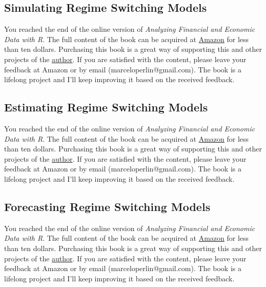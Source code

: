 \documentclass[
  12pt,
]{book}
\newenvironment{pleasebuyit}
{\begin{noteblock}
		
	} {\end{noteblock}}
\begin{document}
\hypertarget{simulating-regime-switching-models}{%
\subsection{Simulating Regime Switching Models}\label{simulating-regime-switching-models}}

\begin{pleasebuyit}
You reached the end of the online version of \emph{Analyzing Financial
and Economic Data with R}. The full content of the book can be acquired
at \href{https://www.amazon.com/dp/B084LSNXMN}{Amazon} for less than ten
dollars. Purchasing this book is a great way of supporting this and
other projects of the \href{https://www.msperlin.com/}{author}. If you
are satisfied with the content, please leave your feedback at Amazon or
by email (marceloperlin@gmail.com). The book is a lifelong project and
I'll keep improving it based on the received feedback.
\end{pleasebuyit}

\hypertarget{estimating-markov}{%
\subsection{Estimating Regime Switching Models}\label{estimating-markov}}

\begin{pleasebuyit}
You reached the end of the online version of \emph{Analyzing Financial
and Economic Data with R}. The full content of the book can be acquired
at \href{https://www.amazon.com/dp/B084LSNXMN}{Amazon} for less than ten
dollars. Purchasing this book is a great way of supporting this and
other projects of the \href{https://www.msperlin.com/}{author}. If you
are satisfied with the content, please leave your feedback at Amazon or
by email (marceloperlin@gmail.com). The book is a lifelong project and
I'll keep improving it based on the received feedback.
\end{pleasebuyit}

\hypertarget{forecasting-regime-switching-models}{%
\subsection{Forecasting Regime Switching Models}\label{forecasting-regime-switching-models}}

\begin{pleasebuyit}
You reached the end of the online version of \emph{Analyzing Financial
and Economic Data with R}. The full content of the book can be acquired
at \href{https://www.amazon.com/dp/B084LSNXMN}{Amazon} for less than ten
dollars. Purchasing this book is a great way of supporting this and
other projects of the \href{https://www.msperlin.com/}{author}. If you
are satisfied with the content, please leave your feedback at Amazon or
by email (marceloperlin@gmail.com). The book is a lifelong project and
I'll keep improving it based on the received feedback.
\end{pleasebuyit}
\end{document}
